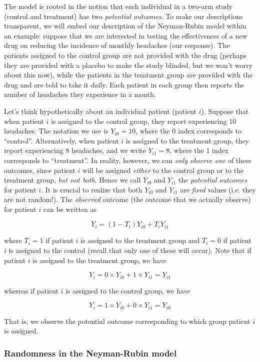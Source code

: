 The model is rooted in the notion that each individual in a two-arm study (control and treatment) has two \emph{potential outcomes}. To make our descriptions transparent, we will embed our description of the Neyman-Rubin model within an example: suppose that we are interested in testing the effectiveness of a new drug on reducing the incidence of monthly headaches (our response). The patients assigned to the control group are not provided with the drug (perhaps they are provided with a placebo to make the study blinded, but we won't worry about this now), while the patients in the treatment group are provided with the drug and are told to take it daily. Each patient in each group then reports the number of headaches they experience in a month.

Let's think hypothetically about an individual patient (patient $i$). Suppose that when patient $i$ is assigned to the control group, they report experiencing 10 headaches. The notation we use is $Y_{i0} = 10$, where the 0 index corresponds to ``control''. Alternatively, when patient $i$ is assigned to the treatment group, they report experiencing 8 headaches, and we write $Y_{i1} = 8$, where the 1 index corresponds to ``treatment''. In reality, however, we can \emph{only observe one} of these outcomes, since patient $i$ will be assigned \emph{either} to the control group or to the treatment group, \emph{but not both}. Hence we call $Y_{i0}$ and $Y_{i1}$ the \emph{potential outcomes} for patient $i$. It is crucial to realize that both $Y_{i0}$ and $Y_{i1}$ are \emph{fixed} values (i.e. they are not random!). The \emph{observed} outcome (the outcome that we actually observe) for patient $i$ can be written as

$$Y_i = (1 - T_i) Y_{i0} + T_i Y_{i1}$$

where $T_i = 1$ if patient $i$ is assigned to the treatment group and $T_i = 0$ if patient $i$ is assigned to the control (recall that only one of these will occur). Note that if patient $i$ is assigned to the treatment group, we have

$$Y_i = 0 \times Y_{i0} + 1 \times Y_{i1} = Y_{i1}$$

whereas if patient $i$ is assigned to the control group, we have

$$Y_i = 1 \times Y_{i0} + 0 \times Y_{i1} = Y_{i0}$$

That is, we observe the potential outcome corresponding to which group patient $i$ is assigned.


\subsubsection*{Randomness in the Neyman-Rubin model}

